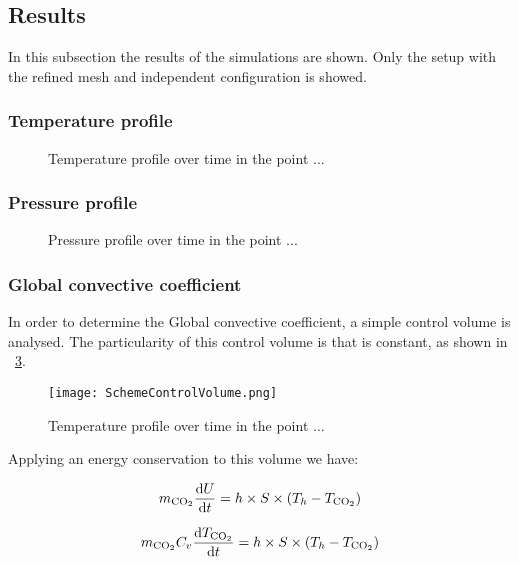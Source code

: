 \subsection{Results} 
In this subsection the results of the simulations are shown. Only the setup
with the refined mesh and independent configuration is showed. 


\subsubsection{Temperature profile}

\begin{figure}[htbp]
	\centering
	\caption{Temperature profile over time in the point ...}
\label{fig:TVStime}
\end{figure}

\subsubsection{Pressure profile}
\begin{figure}[htbp]
	\centering
	\caption{Pressure profile over time in the point ...}
\label{fig:PVStime}
\end{figure}

\subsubsection{Global convective coefficient}

In order to determine the Global convective coefficient, a simple control volume
is analysed. The particularity of this control volume is that is constant, as
shown in ~\ref{fig:SchemeControlVolume}.

\begin{figure}[htbp]
	\centering
	\texttt{[image: SchemeControlVolume.png]}%
	\caption{Temperature profile over time in the point ...}
\label{fig:SchemeControlVolume}
\end{figure}

Applying an energy conservation to this volume we have: 

\begin{equation}
    m_{\ce{CO2}} \frac{\mathrm{d}U}{\mathrm{d}t} = h \times S \times (T_h - T_{\ce{CO2}})
\end{equation}

\begin{equation}
    m_{\ce{CO2}} C_v \frac{\mathrm{d} T_{\ce{CO2}}}{\mathrm{d}t} = h \times S \times (T_h - T_{\ce{CO2}})
\end{equation}

